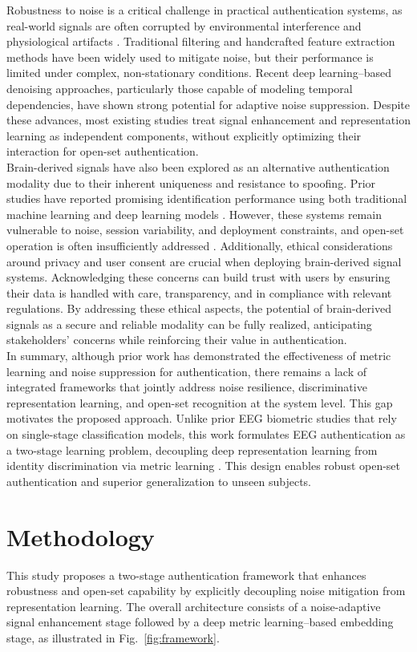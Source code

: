 \documentclass[a4paper,conference]{IEEEtran}
\begin{document}
	Robustness to noise is a critical challenge in practical authentication systems, as real-world signals are often corrupted by environmental interference and physiological artifacts \cite{Alzahab2024}. Traditional filtering and handcrafted feature extraction methods have been widely used to mitigate noise, but their performance is limited under complex, non-stationary conditions. Recent deep learning--based denoising approaches, particularly those capable of modeling temporal dependencies, have shown strong potential for adaptive noise suppression. Despite these advances, most existing studies treat signal enhancement and representation learning as independent components, without explicitly optimizing their interaction for open-set authentication.\\
	Brain-derived signals have also been explored as an alternative authentication modality due to their inherent uniqueness and resistance to spoofing. Prior studies have reported promising identification performance using both traditional machine learning and deep learning models \cite{Fallahi2023,Yang2022,Zhang2017}. However, these systems remain vulnerable to noise, session variability, and deployment constraints, and open-set operation is often insufficiently addressed \cite{Alzahab2024}. Additionally, ethical considerations around privacy and user consent are crucial when deploying brain-derived signal systems. Acknowledging these concerns can build trust with users by ensuring their data is handled with care, transparency, and in compliance with relevant regulations. By addressing these ethical aspects, the potential of brain-derived signals as a secure and reliable modality can be fully realized, anticipating stakeholders' concerns while reinforcing their value in authentication.\\
	In summary, although prior work has demonstrated the effectiveness of metric learning and noise suppression for authentication, there remains a lack of integrated frameworks that jointly address noise resilience, discriminative representation learning, and open-set recognition at the system level. This gap motivates the proposed approach. Unlike prior EEG biometric studies that rely on single-stage classification models, this work formulates EEG authentication as a two-stage learning problem, decoupling deep representation learning from identity discrimination via metric learning \cite{Hadsell2006,Schroff2015,Deng2019,Wang2019}. This design enables robust open-set authentication and superior generalization to unseen subjects.
	\section{Methodology}
	This study proposes a two-stage authentication framework that enhances robustness and open-set capability by explicitly decoupling noise mitigation from representation learning. The overall architecture consists of a noise-adaptive signal enhancement stage followed by a deep metric learning--based embedding stage, as illustrated in Fig.~\ref{fig:framework}.
	
\end{document}
